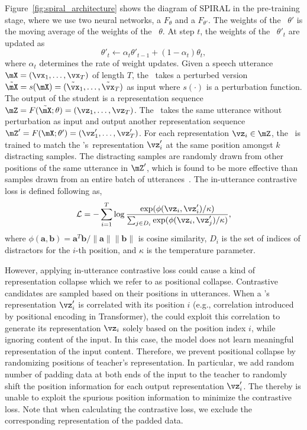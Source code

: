 Figure~\ref{fig:spiral_architecture} shows the diagram of SPIRAL in the pre-training stage, 
where we use two neural networks, a \textit{\student} $F_\theta$ and a \textit{\teacher} $F_{\theta'}$.
The weights of the \teacher\ $\theta'$ is the moving average of the weights of the \student\ $\theta$. At step $t$, the weights of the \teacher\ $\theta'_t$ are updated as
\begin{equation}
\theta'_t \leftarrow \alpha_t\theta'_{t-1} +  (1-\alpha_t)\theta_t,
\label{eqn:ema_update}
\end{equation}
where $\alpha_t$ determines the rate of weight updates.
Given a speech utterance $\mX=(
\vx_1, \ldots, \vx_T)$ of length $T$, the \student\ takes a perturbed version $\tilde{\mX} = s(\mX) = (\tilde{\vx}_1, \ldots, \tilde{\vx}_T)$ as input where $s(\cdot)$ is a perturbation function. 
The output of the student is a representation sequence $\mZ = F(\tilde{\mX};\theta) = (\vz_1, \ldots, \vz_T)$.
The \teacher\ takes the same utterance without perturbation as input and output another representation sequence $\mZ' = F(\mX;\theta') = (\vz'_1, \ldots, \vz'_T)$.
For each representation $\vz_i \in \mZ$, the \student\ is trained to match the \teacher{}'s\ representation $\vz'_i$ at the same position amongst $k$ distracting samples.
The distracting samples are randomly drawn from other positions of the same utterance in $\mZ'$, which is found to be more effective than samples drawn from an entire batch of utterances~\citep{wav2vec2}. 
The in-utterance contrastive loss is defined following \citet{sohn2016improved,wu2018unsupervised} as,
\begin{equation}
   \mathcal{L} = -\sum_{i=1}^T {\log \frac{\exp(\phi(\vz_i, \vz'_i)/\kappa)}{\sum_{j \in D_i} \exp(\phi(\vz_i, \vz'_j)/\kappa)}},
\label{eqn:contrastive_loss}
\end{equation}
where $\phi(\mathbf{a},\mathbf{b}) = \mathbf{a}^{T} \mathbf{b} / \|\mathbf{a}\| \|\mathbf{b}\|$ is cosine similarity, $D_i$ is the set of indices of distractors for the $i$-th position, and $\kappa$ is the temperature parameter.

However, applying in-utterance contrastive loss could cause a kind of representation collapse which we refer to as positional collapse.
Contrastive candidates are sampled based on their positions in utterances. 
When a \teacher{}'s representation $\vz'_i$ is correlated with its position $i$ (e.g., correlation introduced by positional encoding in Transformer), the \student{} could exploit this correlation to generate its representation $\vz_i$ solely based on the position index $i$, while ignoring content of the input.
In this case, 
the model does not learn meaningful representation of the input content.
Therefore, we prevent positional collapse by randomizing positions of teacher's representation. In particular, we add random number of padding data at both ends of the input to the teacher to randomly shift the position information for each output representation $\vz'_i$. The \student{} thereby is unable to exploit the spurious position information to minimize the contrastive loss. Note that when calculating the contrastive loss, we exclude the corresponding representation of the padded data.

